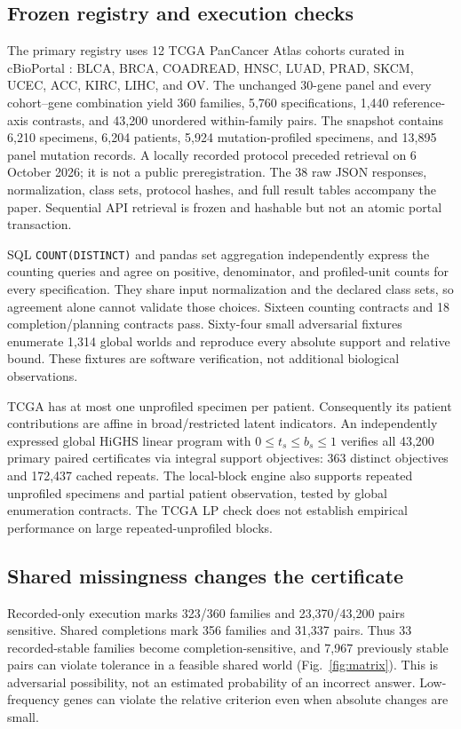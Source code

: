 \subsection{Frozen registry and execution checks}
The primary registry uses 12 TCGA PanCancer Atlas cohorts curated in cBioPortal \cite{cerami,gao,hoadley}: BLCA, BRCA, COADREAD, HNSC, LUAD, PRAD, SKCM, UCEC, ACC, KIRC, LIHC, and OV. The unchanged 30-gene panel and every cohort--gene combination yield 360 families, 5,760 specifications, 1,440 reference-axis contrasts, and 43,200 unordered within-family pairs. The snapshot contains 6,210 specimens, 6,204 patients, 5,924 mutation-profiled specimens, and 13,895 panel mutation records. A locally recorded protocol preceded retrieval on 6 October 2026; it is not a public preregistration. The 38 raw JSON responses, normalization, class sets, protocol hashes, and full result tables accompany the paper. Sequential API retrieval is frozen and hashable but not an atomic portal transaction.

SQL \texttt{COUNT(DISTINCT)} and pandas set aggregation independently express the counting queries and agree on positive, denominator, and profiled-unit counts for every specification. They share input normalization and the declared class sets, so agreement alone cannot validate those choices. Sixteen counting contracts and 18 completion/planning contracts pass. Sixty-four small adversarial fixtures enumerate 1,314 global worlds and reproduce every absolute support and relative bound. These fixtures are software verification, not additional biological observations.

TCGA has at most one unprofiled specimen per patient. Consequently its patient contributions are affine in broad/restricted latent indicators. An independently expressed global HiGHS linear program with $0\leq t_s\leq b_s\leq1$ verifies all 43,200 primary paired certificates via integral support objectives: 363 distinct objectives and 172,437 cached repeats. The local-block engine also supports repeated unprofiled specimens and partial patient observation, tested by global enumeration contracts. The TCGA LP check does not establish empirical performance on large repeated-unprofiled blocks.

\subsection{Shared missingness changes the certificate}
Recorded-only execution marks 323/360 families and 23,370/43,200 pairs sensitive. Shared completions mark 356 families and 31,337 pairs. Thus 33 recorded-stable families become completion-sensitive, and 7,967 previously stable pairs can violate tolerance in a feasible shared world (Fig.~\ref{fig:matrix}). This is adversarial possibility, not an estimated probability of an incorrect answer. Low-frequency genes can violate the relative criterion even when absolute changes are small.

